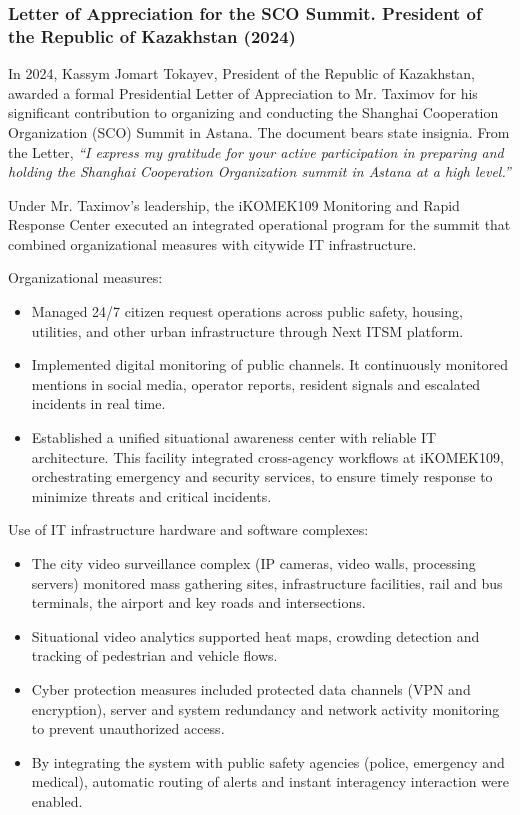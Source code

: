 \subsubsection{Letter of Appreciation for the SCO Summit. President of the Republic of Kazakhstan (2024)}

In 2024, Kassym Jomart Tokayev, President of the Republic of Kazakhstan, awarded a formal Presidential Letter of Appreciation to Mr. Taximov for his significant contribution to organizing and conducting the Shanghai Cooperation Organization (SCO) Summit in Astana. The document bears state insignia. From the Letter, \emph{``I express my gratitude for your active participation in preparing and holding the Shanghai Cooperation Organization summit in Astana at a high level.''} 

Under Mr. Taximov's leadership, the iKOMEK109 Monitoring and Rapid Response Center executed an integrated operational program for the summit that combined organizational measures with citywide IT infrastructure.


\noindent Organizational measures:
\vspace{-0.5\baselineskip}
\begin{itemize}[nosep]
\item Managed 24/7 citizen request operations across public safety, housing, utilities, and other urban infrastructure through Next ITSM platform.
\item Implemented digital monitoring of public channels. It continuously monitored mentions in social media, operator reports, resident signals and escalated incidents in real time.
\item Established a unified situational awareness center with reliable IT architecture. This facility integrated cross-agency workflows at iKOMEK109, orchestrating emergency and security services, to ensure timely response to minimize threats and critical incidents.
\end{itemize}

Use of IT infrastructure hardware and software complexes: 
\vspace{-0.5\baselineskip}
\begin{itemize}[nosep]
\item The city video surveillance complex (IP cameras, video walls, processing servers) monitored mass gathering sites, infrastructure facilities, rail and bus terminals, the airport and key roads and intersections.
\item Situational video analytics supported heat maps, crowding detection and tracking of pedestrian and vehicle flows.
\item Cyber protection measures included protected data channels (VPN and encryption), server and system redundancy and network activity monitoring to prevent unauthorized access.
\item By integrating the system with public safety agencies (police, emergency and medical), automatic routing of alerts and instant interagency interaction were enabled.
\end{itemize}

